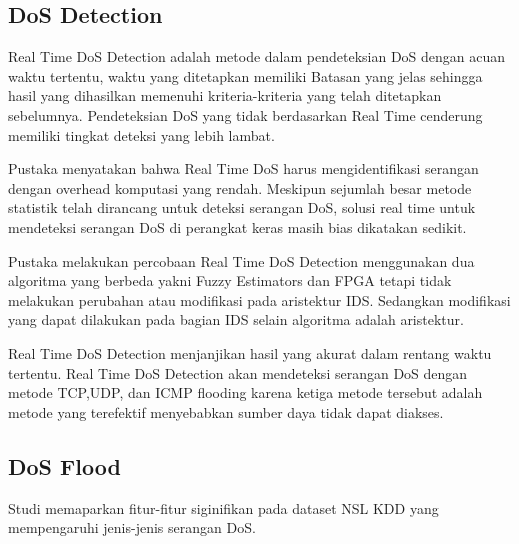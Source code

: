 \subsection{DoS Detection}

Real Time DoS Detection adalah metode dalam pendeteksian DoS dengan acuan waktu tertentu, waktu yang ditetapkan memiliki Batasan yang jelas \cite{ddosfuzzy} sehingga hasil yang dihasilkan memenuhi kriteria-kriteria yang telah ditetapkan sebelumnya.
Pendeteksian DoS yang tidak berdasarkan Real Time cenderung memiliki tingkat deteksi yang lebih lambat\cite{ddosfuzzy}.

Pustaka \cite{ddosfpga} menyatakan bahwa Real Time DoS harus mengidentifikasi serangan dengan overhead komputasi yang rendah. Meskipun sejumlah besar metode statistik telah dirancang untuk deteksi serangan DoS, solusi real time untuk mendeteksi serangan DoS di perangkat keras masih bias dikatakan sedikit.

Pustaka \cite{ddosfuzzy}\cite{ddosfpga} melakukan percobaan Real Time DoS Detection menggunakan dua algoritma yang berbeda yakni Fuzzy Estimators dan FPGA tetapi tidak melakukan perubahan atau modifikasi pada aristektur IDS. Sedangkan modifikasi yang dapat dilakukan pada bagian IDS selain algoritma adalah aristektur.

Real Time DoS Detection menjanjikan hasil yang akurat dalam rentang waktu tertentu\cite{ddosfuzzy}. Real Time DoS Detection akan mendeteksi serangan DoS dengan metode TCP,UDP, dan ICMP flooding karena ketiga metode tersebut adalah metode yang terefektif menyebabkan sumber daya tidak dapat diakses\cite{ddosstat}.


\subsection{DoS Flood}

Studi \cite{das_ddos_2019} memaparkan fitur-fitur siginifikan pada dataset NSL KDD yang mempengaruhi jenis-jenis serangan DoS.

